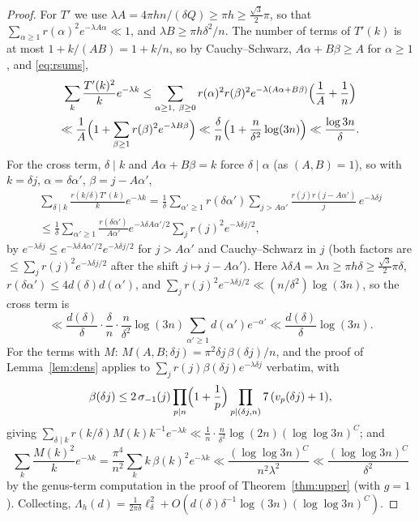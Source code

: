 ﻿\documentclass[11pt]{amsart}
\theoremstyle{remark}
\begin{document}
\begin{proof}
For $T'$ we use $\lambda A=4\pi hn/(\delta Q)\ge\pi h\ge\frac{\sqrt3}2\pi$, so that $\sum_{\alpha\ge1}r(\alpha)^2e^{-\lambda A\alpha}\ll1$, and $\lambda B\ge\pi h\delta^2/n$. The number of terms of $T'(k)$ is at most $1+k/(AB)=1+k/n$, so by Cauchy--Schwarz, $A\alpha+B\beta\ge A$ for $\alpha\ge1$, and \eqref{eq:rsums},
\begin{multline*}
\sum_k\frac{T'(k)^2}k e^{-\lambda k}\le\sum_{\alpha\ge1,\ \beta\ge0}r(\alpha)^2r(\beta)^2e^{-\lambda(A\alpha+B\beta)}\Bigl(\frac1A+\frac1n\Bigr)\\
\ll\frac1A\Bigl(1+\sum_{\beta\ge1}r(\beta)^2e^{-\lambda B\beta}\Bigr)\ll\frac\delta n\Bigl(1+\frac n{\delta^2}\log(3n)\Bigr)\ll\frac{\log 3n}\delta .
\end{multline*}
For the cross term, $\delta\mid k$ and $A\alpha+B\beta=k$ force $\delta\mid\alpha$ (as $(A,B)=1$), so with $k=\delta j$, $\alpha=\delta\alpha'$, $\beta=j-A\alpha'$,
\begin{multline*}
\sum_{\delta\mid k}\frac{r(k/\delta)T'(k)}ke^{-\lambda k}=\frac1\delta\sum_{\alpha'\ge1}r(\delta\alpha')\sum_{j>A\alpha'}\frac{r(j)r(j-A\alpha')}j\,e^{-\lambda\delta j}\\
\le\frac1\delta\sum_{\alpha'\ge1}\frac{r(\delta\alpha')}{A\alpha'}e^{-\lambda\delta A\alpha'/2}\sum_jr(j)^2e^{-\lambda\delta j/2},
\end{multline*}
by $e^{-\lambda\delta j}\le e^{-\lambda\delta A\alpha'/2}e^{-\lambda\delta j/2}$ for $j>A\alpha'$ and Cauchy--Schwarz in $j$ (both factors are $\le\sum_jr(j)^2e^{-\lambda\delta j/2}$ after the shift $j\mapsto j-A\alpha'$). Here $\lambda\delta A=\lambda n\ge\pi h\delta\ge\frac{\sqrt3}2\pi\delta$, $r(\delta\alpha')\le4d(\delta)d(\alpha')$, and $\sum_jr(j)^2e^{-\lambda\delta j/2}\ll(n/\delta^2)\log(3n)$, so the cross term is
\[
\ll\frac{d(\delta)}{\delta}\cdot\frac{\delta}{n}\cdot\frac n{\delta^2}\log(3n)\sum_{\alpha'\ge1}d(\alpha')e^{-\alpha'}\ll\frac{d(\delta)}{\delta}\log(3n).
\]
For the terms with $M$: $M(A,B;\delta j)=\pi^2\delta j\,\beta(\delta j)/n$, and the proof of Lemma~\ref{lem:dens} applies to $\sum_jr(j)\beta(\delta j)e^{-\lambda\delta j}$ verbatim, with
\[
\beta(\delta j)\le2\,\sigma_{-1}(j)\prod_{p\mid n}\Bigl(1+\frac1p\Bigr)\prod_{p\mid(\delta j,n)}7\,(v_p(\delta j)+1),
\]
giving $\sum_{\delta\mid k}r(k/\delta)M(k)k^{-1}e^{-\lambda k}\ll\frac1n\cdot\frac n{\delta^2}\log(2n)(\log\log3n)^{C}$; and
\[
\sum_k\frac{M(k)^2}ke^{-\lambda k}=\frac{\pi^4}{n^2}\sum_kk\,\beta(k)^2e^{-\lambda k}\ll\frac{(\log\log3n)^{C}}{n^2\lambda^{2}}\ll\frac{(\log\log3n)^{C}}{\delta^2}
\]
by the genus-term computation in the proof of Theorem~\ref{thm:upper} (with $g=1$). Collecting, $\Lambda_h(d)=\frac1{2\pi\delta}\ell_\delta^2+O(d(\delta)\delta^{-1}\log(3n)(\log\log3n)^{C})$.


\end{proof}
\end{document}
